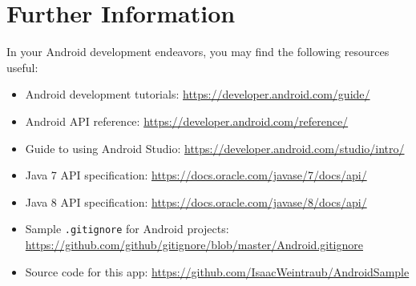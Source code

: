 \documentclass{article}
\begin{document}
\section{Further Information}
In your Android development endeavors, you may find the following resources useful:
\begin{itemize}
\item Android development tutorials: \url{https://developer.android.com/guide/} 
\item Android API reference: \url{https://developer.android.com/reference/}
\item Guide to using Android Studio: \url{https://developer.android.com/studio/intro/} 
\item Java 7 API specification: \url{https://docs.oracle.com/javase/7/docs/api/} 
\item Java 8 API specification: \url{https://docs.oracle.com/javase/8/docs/api/}
\item Sample \texttt{.gitignore} for Android projects:\\ \url{https://github.com/github/gitignore/blob/master/Android.gitignore}
\item Source code for this app: \url{https://github.com/IsaacWeintraub/AndroidSample} 
\end{itemize}
\end{document}
